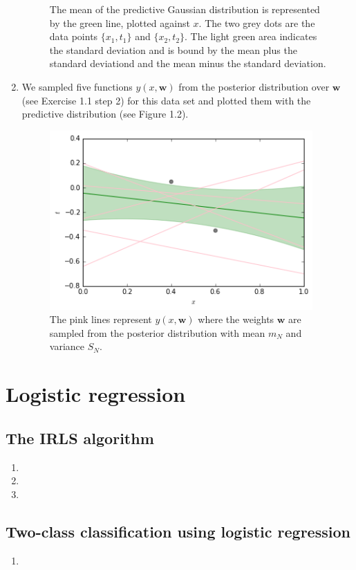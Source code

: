 \documentclass[a4paper,10pt]{article}
\numberwithin{equation}{section} %
\numberwithin{figure}{section} %
\numberwithin{table}{section} %
\theoremstyle{mytheor}
\begin{document}
\begin{enumerate}
\begin{figure}[h]
   			\caption{\vspace{-0.1cm} The mean of the predictive Gaussian distribution is represented by the green line, plotted against $x$. \vspace{-0.1cm}The two grey dots are the data points $\{x_1,t_1\}$ and $\{x_2,t_2\}$. The light green area indicates the standard deviation and is bound by the mean plus the standard deviationd and the mean minus the standard deviation.}\vspace{-0.2cm}
  		\end{figure}
	\item We sampled five functions $y(x, \boldsymbol{w})$ from the posterior distribution over $\boldsymbol{w}$ (see Exercise 1.1 step 2) for this data set and plotted them with the predictive distribution (see Figure 1.2). 
		\begin{figure}[h!]
   			\centering
   			\includegraphics[width=0.95\textwidth]{exercise1plotta.png}\vspace{-0.4cm}
   			\caption{\vspace{-0.0cm} The pink lines represent $y(x,\boldsymbol{w})$ where the weights $\boldsymbol{w}$ are sampled from the posterior distribution with mean $m_N$ and variance $S_N$.}
  		\end{figure}
\end{enumerate}

\vfill 

\section{Logistic regression}
\subsection{The IRLS algorithm}
\begin{enumerate}
	\item 
	\item 
	\item 
\end{enumerate}

\subsection{Two-class classification using logistic regression}
\begin{enumerate}
	\item 
\end{enumerate}
\end{document}
